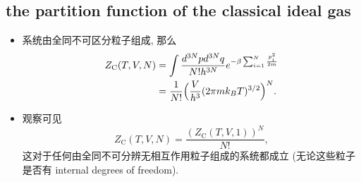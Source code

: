 \subsection{the partition function of the classical ideal gas} \label{subsection 3.3.1}
\begin{itemize}
	\item 系统由全同不可区分粒子组成, 那么
	\begin{align}
		Z_\text{C}(T, V, N) &= \int \frac{d^{3 N} p d^{3 N} q}{N! h^{3 N}} e^{- \beta \sum_{i = 1}^N \frac{p_i^2}{2 m}} \notag \\
		&= \frac{1}{N!} \Big( \frac{V}{h^3} (2 \pi m k_B T)^{3 / 2} \Big)^N.
	\end{align}
	
	\item 观察可见
	\begin{equation}
		Z_\text{C}(T, V , N) = \frac{(Z_\text{C}(T, V , 1))^N}{N!},
	\end{equation}
	这对于任何由全同不可分辨无相互作用粒子组成的系统都成立 (无论这些粒子是否有 internal degrees of freedom).
\end{itemize}

